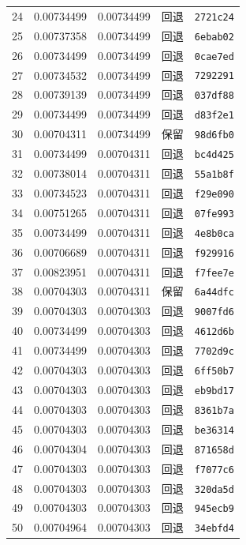 \begin{longtable}{rrrll}
24 & 0.00734499 & 0.00734499 & 回退 & \texttt{2721c24} \\
25 & 0.00737358 & 0.00734499 & 回退 & \texttt{6ebab02} \\
26 & 0.00734499 & 0.00734499 & 回退 & \texttt{0cae7ed} \\
27 & 0.00734532 & 0.00734499 & 回退 & \texttt{7292291} \\
28 & 0.00739139 & 0.00734499 & 回退 & \texttt{037df88} \\
29 & 0.00734499 & 0.00734499 & 回退 & \texttt{d83f2e1} \\
30 & 0.00704311 & 0.00734499 & 保留 & \texttt{98d6fb0} \\
31 & 0.00734499 & 0.00704311 & 回退 & \texttt{bc4d425} \\
32 & 0.00738014 & 0.00704311 & 回退 & \texttt{55a1b8f} \\
33 & 0.00734523 & 0.00704311 & 回退 & \texttt{f29e090} \\
34 & 0.00751265 & 0.00704311 & 回退 & \texttt{07fe993} \\
35 & 0.00734499 & 0.00704311 & 回退 & \texttt{4e8b0ca} \\
36 & 0.00706689 & 0.00704311 & 回退 & \texttt{f929916} \\
37 & 0.00823951 & 0.00704311 & 回退 & \texttt{f7fee7e} \\
38 & 0.00704303 & 0.00704311 & 保留 & \texttt{6a44dfc} \\
39 & 0.00704303 & 0.00704303 & 回退 & \texttt{9007fd6} \\
40 & 0.00734499 & 0.00704303 & 回退 & \texttt{4612d6b} \\
41 & 0.00734499 & 0.00704303 & 回退 & \texttt{7702d9c} \\
42 & 0.00704303 & 0.00704303 & 回退 & \texttt{6ff50b7} \\
43 & 0.00704303 & 0.00704303 & 回退 & \texttt{eb9bd17} \\
44 & 0.00704303 & 0.00704303 & 回退 & \texttt{8361b7a} \\
45 & 0.00704303 & 0.00704303 & 回退 & \texttt{be36314} \\
46 & 0.00704304 & 0.00704303 & 回退 & \texttt{871658d} \\
47 & 0.00704303 & 0.00704303 & 回退 & \texttt{f7077c6} \\
48 & 0.00704303 & 0.00704303 & 回退 & \texttt{320da5d} \\
49 & 0.00704303 & 0.00704303 & 回退 & \texttt{945ecb9} \\
50 & 0.00704964 & 0.00704303 & 回退 & \texttt{34ebfd4} \\

\end{longtable}
